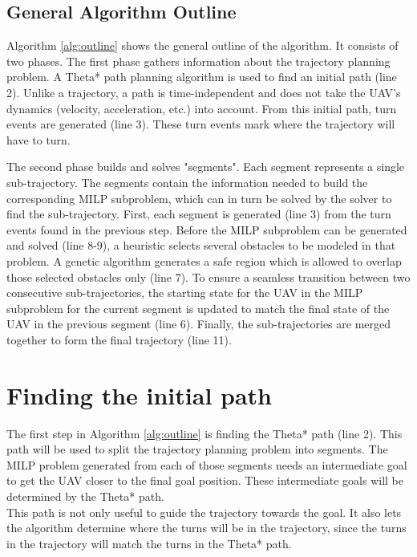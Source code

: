 \subsection{General Algorithm Outline}
Algorithm \ref{alg:outline} shows the general outline of the algorithm. It consists of two phases. The first phase gathers information about the trajectory planning problem. A Theta* path planning algorithm is used to find an initial path (line 2). Unlike a trajectory, a path is time-independent and does not take the UAV's dynamics (velocity, acceleration, etc.) into account. From this initial path, turn events are generated (line 3). These turn events mark where the trajectory will have to turn.
\par
The second phase builds and solves "segments". Each segment represents a single sub-trajectory. The segments contain the information needed to build the corresponding MILP subproblem, which can in turn be solved by the solver to find the sub-trajectory. First, each segment is generated (line 3) from the turn events found in the previous step. Before the MILP subproblem can be generated and solved (line 8-9), a heuristic selects several obstacles to be modeled in that problem. A genetic algorithm generates a safe region which is allowed to overlap those selected obstacles only (line 7). To ensure a seamless transition between two consecutive sub-trajectories, the starting state for the UAV in the MILP subproblem for the current segment is updated to match the final state of the UAV in the previous segment (line 6). Finally, the sub-trajectories are merged together to form the final trajectory (line 11).

\section{Finding the initial path}
\label{subsec:initial-path}
The first step in Algorithm \ref{alg:outline} is finding the Theta* path (line 2). This path will be used to split the trajectory planning problem into segments. The MILP problem generated from each of those segments needs an intermediate goal to get the UAV closer to the final goal position. These intermediate goals will be determined by the Theta* path. \\
This path is not only useful to guide the trajectory towards the goal. It also lets the algorithm determine where the turns will be in the trajectory, since the turns in the trajectory will match the turns in the Theta* path.


